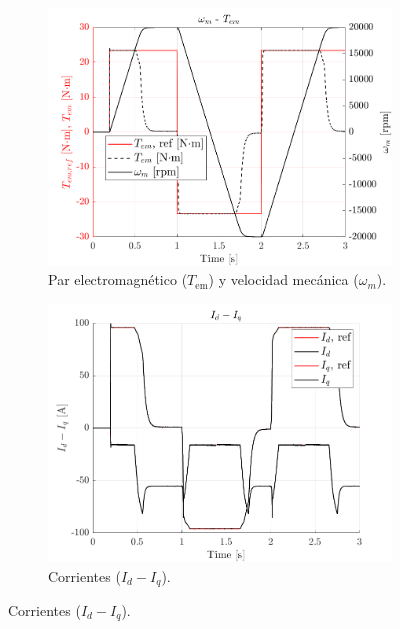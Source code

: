 \begin{figure}[H]
    \centering

    \begin{subfigure}{0.4\textwidth}
        \includegraphics[width=\linewidth]{fig/PLECS_Tem.png}
        \caption{Par electromagnético ($T_{\text{em}}$) y velocidad mecánica ($\omega_{m}$).}
    \end{subfigure}
    \begin{subfigure}{0.4\textwidth}
        \includegraphics[width=\linewidth]{fig/PLECS_idiq.png}
        \caption{Corrientes ($I_{d} - I_{q}$).}
    \end{subfigure}


\end{figure}
